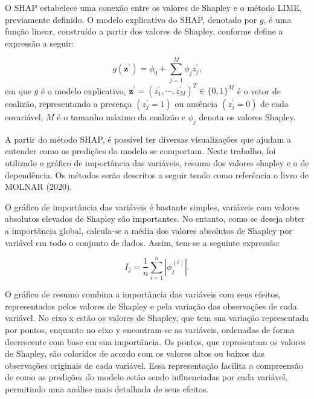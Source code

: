 \documentclass[
  12pt,
  a4paper,
]{scrreprt}
\begin{document}
\vspace{12pt}

O SHAP estabelece uma conexão entre os valores de Shapley e o método
LIME, previamente definido. O modelo explicativo do SHAP, denotado por
\(g\), é uma função linear, construído a partir dos valores de Shapley,
conforme define a expressão a seguir:

\[
g\left(\mathbf{z^{'}}\right) = \phi_0 + \sum_{j = 1}^{M} \phi_{j} z_{j}^{'}\text{,}
\] em que \(g\) é o modelo explicativo,
\(\mathbf{z^{'}} = \left(z_{1}^{'}, \cdots, z^{'}_{M}\right)^T \in \{0, 1\}^{M}\)
é o vetor de coalizão, representando a presença
\(\left(z^{'}_j = 1\right)\) ou ausência \(\left(z^{'}_j = 0\right)\) de
cada covariável, \(M\) é o tamanho máximo da coalizão e \(\phi_j\)
denota os valores Shapley.

\vspace{12pt}

A partir do método SHAP, é possível ter diversas visualizações que
ajudam a entender como as predições do modelo se comportam. Neste
trabalho, foi utilizado o gráfico de importância das variáveis, resumo
dos valores shapley e o de dependência. Os métodos serão descritos a
seguir tendo como referência o livro de MOLNAR (2020).

\vspace{12pt}

O gráfico de importância das variáveis é bastante simples, variáveis com
valores absolutos elevados de Shapley são importantes. No entanto, como
se deseja obter a importância global, calcula-se a média dos valores
absolutos de Shapley por variável em todo o conjunto de dados. Assim,
tem-se a seguinte expressão:

\[
I_j = \frac{1}{n}\sum^{n}_{i = 1} |\phi_j^{\left(i\right)}|\text{.}
\]

O gráfico de resumo combina a importância das variáveis com seus
efeitos, representados pelos valores de Shapley e pela variação das
observações de cada variável. No eixo x estão os valores de Shapley, que
tem sua variação representada por pontos, enquanto no eixo y
encontram-se as variáveis, ordenadas de forma decrescente com base em
sua importância. Os pontos, que representam os valores de Shapley, são
coloridos de acordo com os valores altos ou baixos das observações
originais de cada variável. Essa representação facilita a compreensão de
como as predições do modelo estão sendo influenciadas por cada variável,
permitindo uma análise mais detalhada de seus efeitos.

\vspace{12pt}
\end{document}

